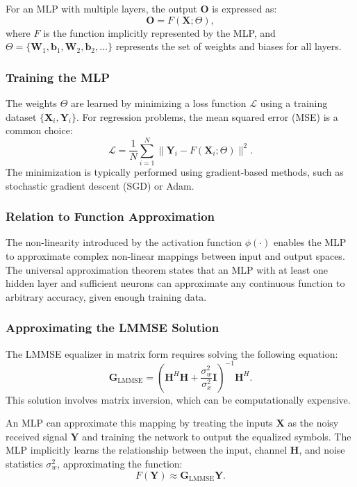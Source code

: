 For an MLP with multiple layers, the output \( \mathbf{O} \) is expressed as:
\begin{equation}
\mathbf{O} = F(\mathbf{X}; \Theta),
\label{eq:mlp_output}
\end{equation}
where \( F \) is the function implicitly represented by the MLP, and \( \Theta = \{ \mathbf{W}_1, \mathbf{b}_1, \mathbf{W}_2, \mathbf{b}_2, \dots \} \) represents the set of weights and biases for all layers.

\subsubsection{Training the MLP}
The weights \( \Theta \) are learned by minimizing a loss function \( \mathcal{L} \) using a training dataset \(\{\mathbf{X}_i, \mathbf{Y}_i\}\). For regression problems, the mean squared error (MSE) is a common choice:
\begin{equation}
\mathcal{L} = \frac{1}{N} \sum_{i=1}^N \|\mathbf{Y}_i - F(\mathbf{X}_i; \Theta)\|^2.
\label{eq:mlp_loss}
\end{equation}
The minimization is typically performed using gradient-based methods, such as stochastic gradient descent (SGD) or Adam.

\subsubsection{Relation to Function Approximation}
The non-linearity introduced by the activation function \( \phi(\cdot) \) enables the MLP to approximate complex non-linear mappings between input and output spaces. The universal approximation theorem states that an MLP with at least one hidden layer and sufficient neurons can approximate any continuous function to arbitrary accuracy, given enough training data.

\subsubsection{Approximating the LMMSE Solution}
The LMMSE equalizer in matrix form requires solving the following equation:
\begin{equation}
\mathbf{G}_{\text{LMMSE}} = \left( \mathbf{H}^H \mathbf{H} + \frac{\sigma_w^2}{\sigma_x^2} \mathbf{I} \right)^{-1} \mathbf{H}^H.
\label{eq:lmmse_solution}
\end{equation}
This solution involves matrix inversion, which can be computationally expensive.

An MLP can approximate this mapping by treating the inputs \( \mathbf{X} \) as the noisy received signal \( \mathbf{Y} \) and training the network to output the equalized symbols. The MLP implicitly learns the relationship between the input, channel \( \mathbf{H} \), and noise statistics \( \sigma_w^2 \), approximating the function:
\begin{equation}
F(\mathbf{Y}) \approx \mathbf{G}_{\text{LMMSE}} \mathbf{Y}.
\end{equation}

